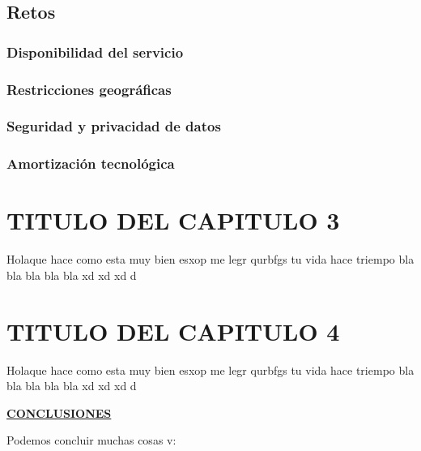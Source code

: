 \documentclass[a4paper, 12pt]{report}
\begin{document}
\section{Retos}
\subsection{Disponibilidad del servicio}
\subsection{Restricciones geogr\'aficas}
\subsection{Seguridad y privacidad de datos}
\subsection{Amortizaci\'on tecnol\'ogica}
\vspace*{5em}
\chapter{TITULO DEL CAPITULO 3}
\vspace*{-2em}
\begin{justify}
Holaque hace como esta muy bien esxop me legr qurbfgs tu vida hace triempo bla bla bla bla bla xd xd xd d
\end{justify}

\vspace*{5em}
\chapter{TITULO DEL CAPITULO 4}
\vspace*{-2em}
\begin{justify}
Holaque hace como esta muy bien esxop me legr qurbfgs tu vida hace triempo bla bla bla bla bla xd xd xd d
\end{justify}



\newpage
\vspace*{6em}
\begin{center}
{\bf{\large{\underline{CONCLUSIONES}}}}
\end{center}
\begin{justify}
Podemos concluir muchas cosas v:
\end{justify}



\vspace*{6em}
	
\end{document}
